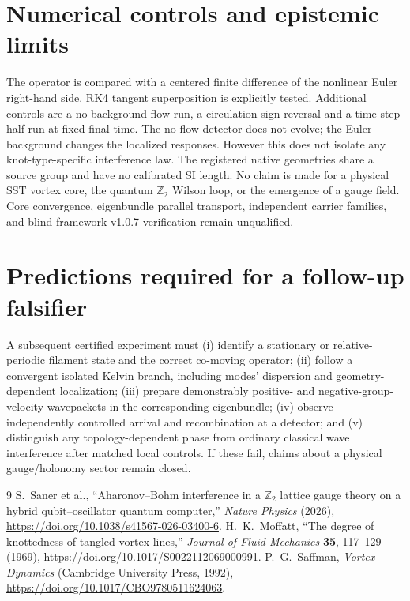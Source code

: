 \documentclass[11pt,a4paper]{article}
\begin{document}
\section{Numerical controls and epistemic limits}
The operator is compared with a centered finite difference of the nonlinear Euler right-hand side. RK4 tangent superposition is explicitly tested. Additional controls are a no-background-flow run, a circulation-sign reversal and a time-step half-run at fixed final time. The no-flow detector does not evolve; the Euler background changes the localized responses. However this does not isolate any knot-type-specific interference law. The registered native geometries share a source group and have no calibrated SI length. No claim is made for a physical SST vortex core, the quantum $\mathbb Z_2$ Wilson loop, or the emergence of a gauge field. Core convergence, eigenbundle parallel transport, independent carrier families, and blind framework v1.0.7 verification remain unqualified.
\section{Predictions required for a follow-up falsifier}
A subsequent certified experiment must (i) identify a stationary or relative-periodic filament state and the correct co-moving operator; (ii) follow a convergent isolated Kelvin branch, including modes' dispersion and geometry-dependent localization; (iii) prepare demonstrably positive- and negative-group-velocity wavepackets in the corresponding eigenbundle; (iv) observe independently controlled arrival and recombination at a detector; and (v) distinguish any topology-dependent phase from ordinary classical wave interference after matched local controls. If these fail, claims about a physical gauge/holonomy sector remain closed.
\begin{thebibliography}{9}
 S.~Saner et al., ``Aharonov--Bohm interference in a $\mathbb Z_2$ lattice gauge theory on a hybrid qubit--oscillator quantum computer,'' \emph{Nature Physics} (2026), \url{https://doi.org/10.1038/s41567-026-03400-6}.
 H.~K.~Moffatt, ``The degree of knottedness of tangled vortex lines,'' \emph{Journal of Fluid Mechanics} \textbf{35}, 117--129 (1969), \url{https://doi.org/10.1017/S0022112069000991}.
 P.~G.~Saffman, \emph{Vortex Dynamics} (Cambridge University Press, 1992), \url{https://doi.org/10.1017/CBO9780511624063}.
\end{thebibliography}
\end{document}
